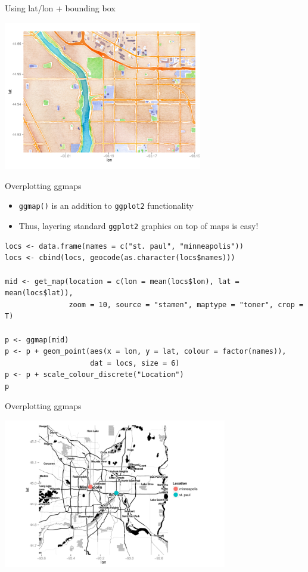 \documentclass[sans,aspectratio=169,presentation,bigger,fleqn]{beamer}
\begin{document}
\begin{frame}[label=sec-7]{Using lat/lon + bounding box}
\begin{center}
\includegraphics[height=6.5cm]{./img/ust-coords-box.pdf}
\end{center}
\end{frame}
\begin{frame}[fragile,label=sec-8]{Overplotting ggmaps}
 \begin{itemize}
\item \texttt{ggmap()} is an addition to \texttt{ggplot2} functionality
\item Thus, layering standard \texttt{ggplot2} graphics on top of maps is easy!
\end{itemize}

\scriptsize
\begin{verbatim}
locs <- data.frame(names = c("st. paul", "minneapolis"))
locs <- cbind(locs, geocode(as.character(locs$names)))

mid <- get_map(location = c(lon = mean(locs$lon), lat = mean(locs$lat)),
               zoom = 10, source = "stamen", maptype = "toner", crop = T)

p <- ggmap(mid)
p <- p + geom_point(aes(x = lon, y = lat, colour = factor(names)),
                    dat = locs, size = 6)
p <- p + scale_colour_discrete("Location")
p
\end{verbatim}

\normalsize
\end{frame}
\begin{frame}[label=sec-9]{Overplotting ggmaps}
\begin{center}
\includegraphics[height=6.5cm]{./img/ggmap-points.pdf}
\end{center}
\end{frame}
\end{document}
